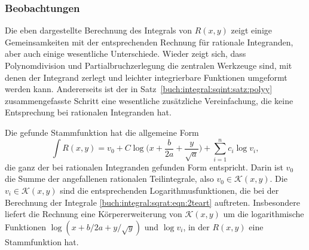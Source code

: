 %
%
\subsubsection{Beobachtungen}
Die eben dargestellte Berechnung des Integrals von $R(x,y)$ zeigt einige
Gemeinsamkeiten mit der entsprechenden Rechnung für rationale
Integranden, aber auch einige wesentliche Unterschiede.
Wieder zeigt sich, dass Polynomdivision und Partialbruchzerlegung
die zentralen Werkzeuge sind, mit denen der Integrand zerlegt und
leichter integrierbare Funktionen umgeformt werden kann.
Andererseits ist der in 
Satz~\ref{buch:integral:sqint:satz:polyy}
zusammengefasste Schritt eine wesentliche zusätzliche Vereinfachung,
die keine Entsprechung bei rationalen Integranden hat.

Die gefunde Stammfunktion hat die allgemeine Form
\begin{equation}
\int R(x,y)
=
v_0 +
C
\log\biggl(x+\frac{b}{2a}+\frac{y}{\sqrt{a}}\biggr)
+
\sum_{i=1}^n c_i
\log v_i,
\label{buch:inetgral:sqrat:eqn:liouville}
\end{equation}
die ganz der bei rationalen Integranden gefunden Form entspricht.
Darin ist $v_0$ die Summe der angefallenen rationalen Teilintegrale,
also $v_0\in\mathcal{K}(x,y)$.
Die $v_i\in\mathcal{K}(x,y)$ sind die entsprechenden Logarithmusfunktionen,
die bei der Berechnung der Integrale \eqref{buch:integral:sqrat:eqn:2teart}
auftreten.
Insbesondere liefert die Rechnung eine Körpererweiterung von
$\mathcal{K}(x,y)$ um die logarithmische Funktionen
$\log(x+b/2a+y/\!\sqrt{y})$ und $\log v_i$, in der $R(x,y)$ eine
Stammfunktion hat.




